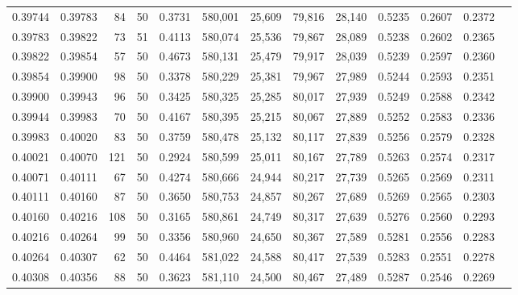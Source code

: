 \begin{tabular}{rrrrrrrrrrrrr}
0.39744 & 0.39783 &    84 &  50 &                                     0.3731 & 580,001 &  25,609 &  79,816 &  28,140 & 0.5235 & 0.2607 & 0.2372 \\
0.39783 & 0.39822 &    73 &  51 &                                     0.4113 & 580,074 &  25,536 &  79,867 &  28,089 & 0.5238 & 0.2602 & 0.2365 \\
0.39822 & 0.39854 &    57 &  50 &                                     0.4673 & 580,131 &  25,479 &  79,917 &  28,039 & 0.5239 & 0.2597 & 0.2360 \\
0.39854 & 0.39900 &    98 &  50 &                                     0.3378 & 580,229 &  25,381 &  79,967 &  27,989 & 0.5244 & 0.2593 & 0.2351 \\
0.39900 & 0.39943 &    96 &  50 &                                     0.3425 & 580,325 &  25,285 &  80,017 &  27,939 & 0.5249 & 0.2588 & 0.2342 \\
0.39944 & 0.39983 &    70 &  50 &                                     0.4167 & 580,395 &  25,215 &  80,067 &  27,889 & 0.5252 & 0.2583 & 0.2336 \\
0.39983 & 0.40020 &    83 &  50 &                                     0.3759 & 580,478 &  25,132 &  80,117 &  27,839 & 0.5256 & 0.2579 & 0.2328 \\
0.40021 & 0.40070 &   121 &  50 &                                     0.2924 & 580,599 &  25,011 &  80,167 &  27,789 & 0.5263 & 0.2574 & 0.2317 \\
0.40071 & 0.40111 &    67 &  50 &                                     0.4274 & 580,666 &  24,944 &  80,217 &  27,739 & 0.5265 & 0.2569 & 0.2311 \\
0.40111 & 0.40160 &    87 &  50 &                                     0.3650 & 580,753 &  24,857 &  80,267 &  27,689 & 0.5269 & 0.2565 & 0.2303 \\
0.40160 & 0.40216 &   108 &  50 &                                     0.3165 & 580,861 &  24,749 &  80,317 &  27,639 & 0.5276 & 0.2560 & 0.2293 \\
0.40216 & 0.40264 &    99 &  50 &                                     0.3356 & 580,960 &  24,650 &  80,367 &  27,589 & 0.5281 & 0.2556 & 0.2283 \\
0.40264 & 0.40307 &    62 &  50 &                                     0.4464 & 581,022 &  24,588 &  80,417 &  27,539 & 0.5283 & 0.2551 & 0.2278 \\
0.40308 & 0.40356 &    88 &  50 &                                     0.3623 & 581,110 &  24,500 &  80,467 &  27,489 & 0.5287 & 0.2546 & 0.2269 \\

\end{tabular}
